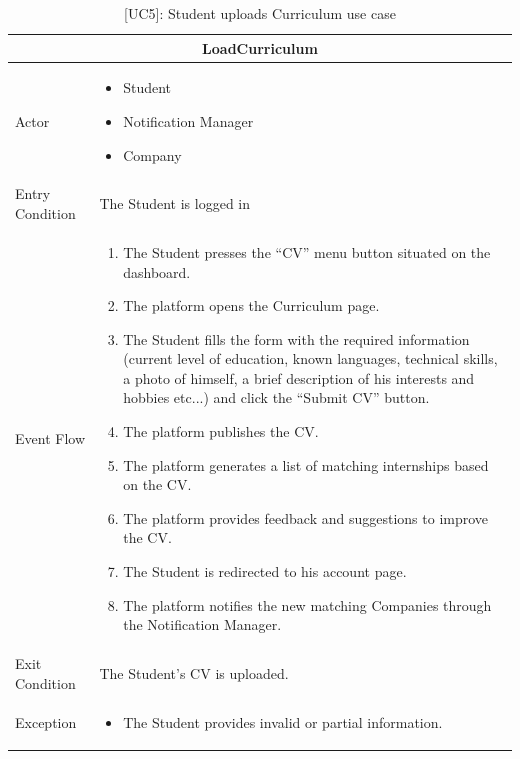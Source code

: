 \begin{table}[H]
    \centering
    \begin{tabular}{|p{3cm}|p{12cm}|}
    \hline
    \multicolumn{2}{|c|}{\textbf{LoadCurriculum}} \\ \hline
    Actor & 
    \begin{itemize}
        \item Student
        \item Notification Manager
        \item Company
    \end{itemize}\\ \hline
    Entry Condition & The Student is logged in \\ \hline
    Event Flow &
    \begin{enumerate}         
        \item The Student presses the “CV” menu button situated on the dashboard.
        \item The platform opens the Curriculum page.
        \item The Student fills the form with the required information (current level of education, known languages, technical skills, a photo of himself, a brief description of his interests and hobbies etc...) and click the “Submit CV” button.
        \item The platform publishes the CV.
        \item The platform generates a list of matching internships based on the CV.
        \item The platform provides feedback and suggestions to improve the CV.
        \item The Student is redirected to his account page.
        \item The platform notifies the new matching Companies through the Notification Manager. 
    \end{enumerate} \\ \hline
    Exit Condition & The Student's CV is uploaded. \\ \hline
    Exception & 
    \begin{itemize} 
        \item The Student provides invalid or partial information.
    \end{itemize} \\ \hline
    \end{tabular}
    \caption{[UC5]: Student uploads Curriculum use case}
    \label{tab:UC5}
\end{table}

